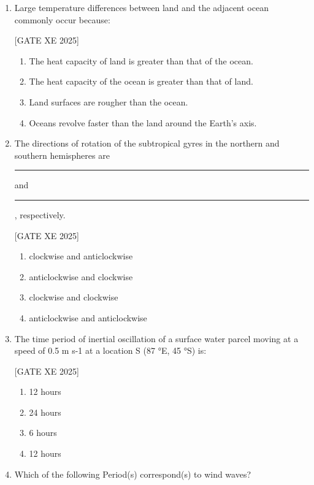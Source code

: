 \documentclass[journal,12pt,onecolumn]{IEEEtran}
\theoremstyle{remark}
\begin{document}
\begin{enumerate}
\item Large temperature differences between land and the adjacent ocean commonly occur because:

\hfill[GATE XE 2025]

\begin{multicols}{2}
\begin{enumerate}
\item The heat capacity of land is greater than that of the ocean.
\item The heat capacity of the ocean is greater than that of land.
\item Land surfaces are rougher than the ocean.
\item Oceans revolve faster than the land around the Earth's axis.
\end{enumerate}
\end{multicols}

\item The directions of rotation of the subtropical gyres in the northern and southern hemispheres are \rule{3cm}{0.15mm} and \rule{3cm}{0.15mm}, respectively.

\hfill[GATE XE 2025]

\begin{multicols}{2}
\begin{enumerate}
\item clockwise and anticlockwise
\item anticlockwise and clockwise
\item clockwise and clockwise
\item anticlockwise and anticlockwise
\end{enumerate}
\end{multicols}

\item The time period of inertial oscillation of a surface water parcel moving at a speed of 0.5 m s-1 at a location S (87 °E, 45 °S) is:

\hfill[GATE XE 2025]

\begin{multicols}{2}
\begin{enumerate}
\item 12 hours
\item 24 hours
\item 6 hours
\item 12 hours
\end{enumerate}
\end{multicols}

\item Which of the following Period(s) correspond(s) to wind waves?


\end{enumerate}
\end{document}
